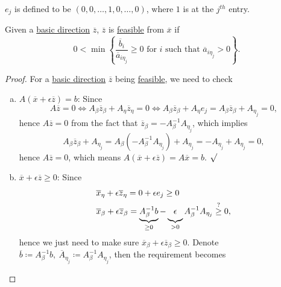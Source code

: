 \begin{notation}
	\(e_j\) is defined to be \((0, 0, \dots, 1, 0, \dots , 0 )\), where \(1\) is at the \(j^{th} \) entry.
\end{notation}

\begin{lemma}\label{lma:lec6-1}
	Given a \hyperref[def:basic-direction]{basic direction} \(\overline{z}\), \(\overline{z}\) is \hyperref[def:feasible-direction]{feasible} from \(\overline{x}\) if
	\[
		0< \min\left\{\frac{\overline{b}_i}{\overline{a}_{i \eta_{j}}}\geq 0 \text{ for }i \text{ such that }\overline{a}_{i \eta_{j}}>0\right\}.
	\]
\end{lemma}
\begin{proof}
	For a \hyperref[def:basic-direction]{basic direction} \(\overline{z}\) being \hyperref[def:feasible-direction]{feasible}, we need to check
	\begin{enumerate}[(a)]
		\item \(A(\overline{x} + \epsilon \overline{z}) = b\): Since
		      \[
			      A \overline{z} = 0 \iff A_{\beta}\overline{z}_{\beta} + A_{\eta}\overline{z}_{\eta} = 0 \iff A_{\beta}\overline{z}_{\beta}+A_{\eta}e_{j} = A_{\beta}\overline{z}_{\beta}+A_{\eta_j} = 0,
		      \]
		      hence \(A \overline{z} = 0\) from the fact that \(\overline{z} _\beta = - A_\beta ^{-1} A_{\eta _{j} }\), which implies
		      \[
			      A_\beta \overline{z} _\beta + A_{\eta _{j} } = A_\beta (- A_\beta ^{-1} A_{\eta _{j} }) + A_{\eta _{j} } = -A_{\eta _{j} } + A_{\eta _{j} } = 0,
		      \]
		      hence \(A \overline{z} = 0\), which means \(A(\overline{x} +\epsilon \overline{z} ) = A \overline{x} = b\). \(\surd\)
		\item \(\overline{x} + \epsilon \overline{z} \geq 0\): Since
		      \[
			      \begin{split}
				       & \overline{x}_{\eta} + \epsilon \overline{z}_{\eta} = 0 + \epsilon e_j \geq  0                                                                                                                  \\
				       & \overline{x}_{\beta}+ \epsilon \overline{z}_{\beta} = \underbrace{A^{-1}_{\beta}b}_{\geq 0} - \underbrace{\vphantom{A^{-1}_{\beta}}\epsilon}_{>0} A^{-1}_{\beta}A_{\eta_j}\overset{?}{\geq} 0,
			      \end{split}
		      \]
		      hence we just need to make sure \(\overline{x} _\beta + \epsilon \overline{z} _\beta \geq 0\). Denote \(\overline{b} \coloneqq A^{-1}_{\beta} b,\ \overline{A}_{\eta_j} \coloneqq A^{-1}_{\beta}A_{\eta_j}\), then the requirement becomes

\end{enumerate}
\end{proof}
